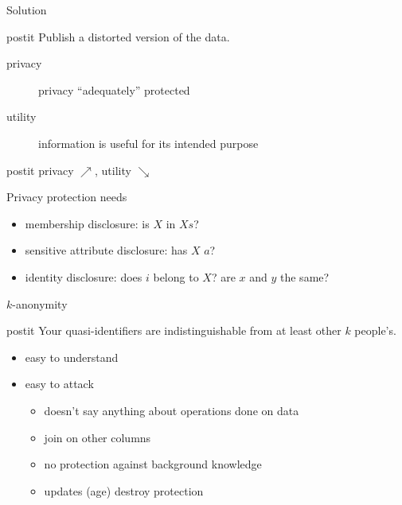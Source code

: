 \documentclass{beamer}
\begin{document}
\begin{frame}{Solution}
  \begin{beamercolorbox}[wd=\textwidth,rounded=true,shadow=true]{postit}
    Publish a distorted version of the data.
  \end{beamercolorbox}
  \pause
  \begin{description}
    \item[privacy] privacy ``adequately'' protected
    \item[utility] information is useful for its intended purpose
  \end{description}
  \pause
  \begin{beamercolorbox}[wd=\textwidth,rounded=true,shadow=true]{postit}
    privacy $\nearrow$, utility $\searrow$
  \end{beamercolorbox}
\end{frame}

\begin{frame}{Privacy protection needs}
  \begin{itemize}
    \item membership disclosure: is $X$ in $Xs$?
    \item sensitive attribute disclosure: has $X$ $a$?
    \item identity disclosure: does $i$ belong to $X$? are $x$ and $y$ the
      same?
  \end{itemize}
\end{frame}

\begin{frame}{$k$-anonymity}
  \begin{beamercolorbox}[wd=\textwidth,rounded=true,shadow=true]{postit}
    Your quasi-identifiers are indistinguishable from at least other $k$
    people's.
  \end{beamercolorbox}
  \pause
  \begin{itemize}
    \item easy to understand
    \item easy to attack
      \begin{itemize}
        \item doesn't say anything about operations done on data
        \item join on other columns
        \item no protection against background knowledge
        \item updates (age) destroy protection
      \end{itemize}
  \end{itemize}
\end{frame}
\end{document}
